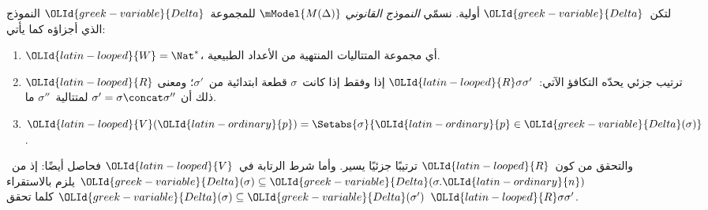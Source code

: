 \documentclass[../../../include/open-logic-section]{subfiles}
\begin{document}
\begin{defn}
  لتكن~${\OLId{greek-variable}{Delta}}$ أولية. نسمّي \emph{النموذج القانوني}
  $\mModel{M(\Delta)}$ للمجموعة~${\OLId{greek-variable}{Delta}}$ النموذج الذي أجزاؤه كما يأتي:
  \begin{enumerate}
  \item ${\OLId{latin-looped}{W}} = \Nat^*$، أي مجموعة المتتاليات المنتهية من الأعداد الطبيعية.
  \item ${\OLId{latin-looped}{R}}$ ترتيب جزئي يحدّه التكافؤ الآتي:~${\OLId{latin-looped}{R}}\sigma\sigma'$ إذا وفقط إذا
    كانت~$\sigma$ قطعة ابتدائية من~$\sigma'$؛ ومعنى ذلك أن
    $\sigma'=\sigma\concat\sigma''$ لمتتالية~$\sigma''$ ما.
  \item ${\OLId{latin-looped}{V}}({\OLId{latin-ordinary}{p}}) = \Setabs{\sigma}{{\OLId{latin-ordinary}{p}} \in {\OLId{greek-variable}{Delta}}(\sigma)}$.
  \end{enumerate}
\end{defn}

والتحقق من كون~${\OLId{latin-looped}{R}}$ ترتيبًا جزئيًا يسير. وأما شرط الرتابة في~${\OLId{latin-looped}{V}}$
فحاصل أيضًا: إذ من~${\OLId{greek-variable}{Delta}}(\sigma)\subseteq{\OLId{greek-variable}{Delta}}(\sigma.{\OLId{latin-ordinary}{n}})$ يلزم بالاستقراء
${\OLId{greek-variable}{Delta}}(\sigma)\subseteq{\OLId{greek-variable}{Delta}}(\sigma')$ كلما تحقق
${\OLId{latin-looped}{R}}\sigma\sigma'$.
\end{document}
